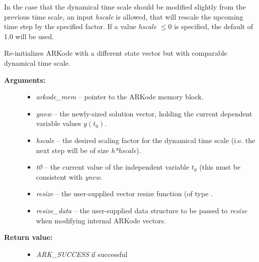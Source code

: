 \documentclass[letterpaper,10pt,english]{sphinxmanual}
\begin{document}
In the case that the dynamical time scale should be modified slightly
from the previous time scale, an input \emph{hscale} is allowed, that will
rescale the upcoming time step by the specified factor.  If a value
\emph{hscale} \(\le 0\) is specified, the default of 1.0 will be used.

\begin{fulllineitems}
\label{c_interface/User_callable:c.ARKodeResize}
Re-initializes ARKode with a different state vector but with
comparable dynamical time scale.
\begin{description}
\item[{\textbf{Arguments:}}] \leavevmode\begin{itemize}
\item {} 
\emph{arkode\_mem} -- pointer to the ARKode memory block.

\item {} 
\emph{ynew} -- the newly-sized solution vector, holding the current
dependent variable values \(y(t_0)\).

\item {} 
\emph{hscale} -- the desired scaling factor for the dynamical time
scale (i.e. the next step will be of size \emph{h*hscale}).

\item {} 
\emph{t0} -- the current value of the independent variable
\(t_0\) (this must be consistent with \emph{ynew}.

\item {} 
\emph{resize} -- the user-supplied vector resize function (of type
{\hyperref[c_interface/User_supplied:c.ARKVecResizeFn]{\emph{}}}.

\item {} 
\emph{resize\_data} -- the user-supplied data structure to be passed
to \emph{resize} when modifying internal ARKode vectors.

\end{itemize}

\item[{\textbf{Return value:}}] \leavevmode\begin{itemize}
\item {} 
\emph{ARK\_SUCCESS} if successful


\end{itemize}
\end{description}
\end{fulllineitems}
\end{document}
